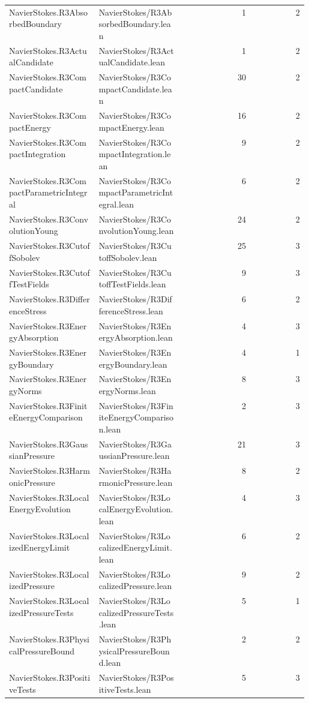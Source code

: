 \begin{longtable}{p{0.30\linewidth}p{0.28\linewidth}rr}
NavierStokes.R3AbsorbedBoundary & NavierStokes/R3AbsorbedBoundary.lean & 1 & 2\\
NavierStokes.R3ActualCandidate & NavierStokes/R3ActualCandidate.lean & 1 & 2\\
NavierStokes.R3CompactCandidate & NavierStokes/R3CompactCandidate.lean & 30 & 2\\
NavierStokes.R3CompactEnergy & NavierStokes/R3CompactEnergy.lean & 16 & 2\\
NavierStokes.R3CompactIntegration & NavierStokes/R3CompactIntegration.lean & 9 & 2\\
NavierStokes.R3CompactParametricIntegral & NavierStokes/R3CompactParametricIntegral.lean & 6 & 2\\
NavierStokes.R3ConvolutionYoung & NavierStokes/R3ConvolutionYoung.lean & 24 & 2\\
NavierStokes.R3CutoffSobolev & NavierStokes/R3CutoffSobolev.lean & 25 & 3\\
NavierStokes.R3CutoffTestFields & NavierStokes/R3CutoffTestFields.lean & 9 & 3\\
NavierStokes.R3DifferenceStress & NavierStokes/R3DifferenceStress.lean & 6 & 2\\
NavierStokes.R3EnergyAbsorption & NavierStokes/R3EnergyAbsorption.lean & 4 & 3\\
NavierStokes.R3EnergyBoundary & NavierStokes/R3EnergyBoundary.lean & 4 & 1\\
NavierStokes.R3EnergyNorms & NavierStokes/R3EnergyNorms.lean & 8 & 3\\
NavierStokes.R3FiniteEnergyComparison & NavierStokes/R3FiniteEnergyComparison.lean & 2 & 3\\
NavierStokes.R3GaussianPressure & NavierStokes/R3GaussianPressure.lean & 21 & 3\\
NavierStokes.R3HarmonicPressure & NavierStokes/R3HarmonicPressure.lean & 8 & 2\\
NavierStokes.R3LocalEnergyEvolution & NavierStokes/R3LocalEnergyEvolution.lean & 4 & 3\\
NavierStokes.R3LocalizedEnergyLimit & NavierStokes/R3LocalizedEnergyLimit.lean & 6 & 2\\
NavierStokes.R3LocalizedPressure & NavierStokes/R3LocalizedPressure.lean & 9 & 2\\
NavierStokes.R3LocalizedPressureTests & NavierStokes/R3LocalizedPressureTests.lean & 5 & 1\\
NavierStokes.R3PhysicalPressureBound & NavierStokes/R3PhysicalPressureBound.lean & 2 & 2\\
NavierStokes.R3PositiveTests & NavierStokes/R3PositiveTests.lean & 5 & 3\\

\end{longtable}
